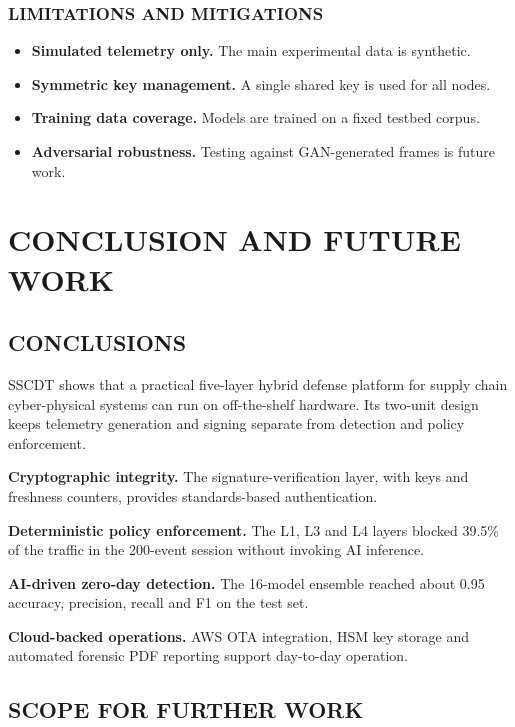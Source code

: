 \documentclass[12pt,a4paper]{amritareport}
\begin{document}
\subsection{LIMITATIONS AND MITIGATIONS}

\begin{itemize}
    \item \textbf{Simulated telemetry only.} The main experimental data is synthetic.
    \item \textbf{Symmetric key management.} A single shared key is used for all nodes.
    \item \textbf{Training data coverage.} Models are trained on a fixed testbed corpus.
    \item \textbf{Adversarial robustness.} Testing against GAN-generated frames is future work.
\end{itemize}

\chapter{CONCLUSION AND FUTURE WORK}

\section{CONCLUSIONS}

SSCDT shows that a practical five-layer hybrid defense platform for supply chain cyber-physical systems can run on off-the-shelf hardware. Its two-unit design keeps telemetry generation and signing separate from detection and policy enforcement.

\textbf{Cryptographic integrity.} The signature-verification layer, with keys and freshness counters, provides standards-based authentication.

\textbf{Deterministic policy enforcement.} The L1, L3 and L4 layers blocked 39.5\% of the traffic in the 200-event session without invoking AI inference.

\textbf{AI-driven zero-day detection.} The 16-model ensemble reached about 0.95 accuracy, precision, recall and F1 on the test set.

\textbf{Cloud-backed operations.} AWS OTA integration, HSM key storage and automated forensic PDF reporting support day-to-day operation.

\section{SCOPE FOR FURTHER WORK}
\end{document}
